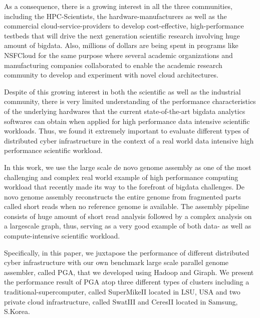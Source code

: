 \documentclass[conference]{IEEEtran}
\begin{document}
As a consequence, there is a growing interest in all the three communities, including the HPC-Scientists, the hardware-manufacturers as well as the commercial cloud-service-providers to develop cost-effective, high-performance testbeds that will drive the next generation scientific research involving huge amount of bigdata.
Also, millions of dollars are being spent in programs like NSFCloud for the same purpose where several academic organizations and manufacturing companies collaborated to enable the academic research community to develop and experiment with novel cloud architectures.

Despite of this growing interest in both the scientific as well as the industrial community, there is very limited understanding of the performance characteristics of the underlying hardwares that the current state-of-the-art bigdata analytics softwares can obtain when applied for high performance data intensive scientific workloads.
Thus, we found it extremely important to evaluate different types of distributed cyber infrastructure in the context of a real world data intensive high performance scientific workload.  

In this work, we use the large scale de novo genome assembly as one of the most challenging and complex real world example of high performance computing workload that recently made its way to the forefront of bigdata challenges.
De novo genome assembly reconstructs the entire genome from fragmented parts called short reads when no reference genome is available.
The assembly pipeline consists of huge amount of short read analysis followed by a  complex analysis on a largescale graph, thus, serving as a very good example of both data- as well as compute-intensive scientific workload.

Specifically, in this paper, we juxtapose the performance of different distributed cyber infrastructure with our own benchmark large scale parallel genome assembler, called PGA, that we developed using Hadoop and Giraph.
We present the performance result of PGA atop three different types of clusters including a traditional-supercomputer, called SuperMikeII located in LSU, USA and two private cloud infrastructure, called SwatIII and CeresII located in Samsung, S.Korea.
\end{document}
